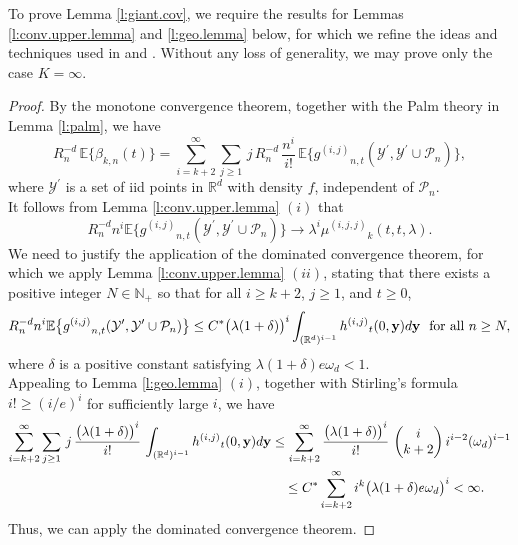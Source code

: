 \documentclass[11pt]{amsart}
\numberwithin{equation}{section}
\theoremstyle{plain}
\theoremstyle{definition}
\begin{document}
To prove Lemma \ref{l:giant.cov}, we require the results for Lemmas \ref{l:conv.upper.lemma} and \ref{l:geo.lemma} below, for which we refine the ideas and techniques used in \cite{kahle:meckes:2015} and \cite{kahle:meckes:2013}. Without any loss of generality, we may prove only the case $K=\infty$.
\begin{proof}
By the monotone convergence theorem, together with the Palm theory in Lemma \ref{l:palm}, we have
$$
R_n^{-d}\, {\mathbb{E}} \bigl\{ \beta_{k,n}(t) \bigr\} = \sum_{i=k+2}^\infty \sum_{j\geq1} \, j\, R_n^{-d}\, \frac{ n^i}{i!}\, {\mathbb{E}} \bigl\{ {g^{(i,j)}}_{n,t}({{\mathcal{Y}^{\prime}}}, {{\mathcal{Y}^{\prime}}} \cup {\mathcal P_n}) \bigr\},
$$
where ${{\mathcal{Y}^{\prime}}}$ is a set of iid points in ${{\mathbb R}}^d$ with density $f$, independent of ${\mathcal P_n}$. \\
It follows from Lemma \ref{l:conv.upper.lemma} $(i)$ that
$$
R_n^{-d} n^i {\mathbb{E}} \bigl\{ {g^{(i,j)}}_{n,t}({{\mathcal{Y}^{\prime}}}, {{\mathcal{Y}^{\prime}}} \cup {\mathcal P_n}) \bigr\} \to \lambda^i {\mu^{(i,j,j)}}_k (t,t,\lambda).
$$
We need to justify the application of the dominated convergence theorem, for which we apply Lemma \ref{l:conv.upper.lemma} $(ii)$,  stating that there exists a positive integer $N \in {{\mathbb N}}_+$ so that for all $i \geq k+2$, $j \geq 1$, and $t\geq 0$,
$$
R_n^{-d} n^i {\mathbb{E}} \bigl\{ {g^{(i,j)}}_{n,t}({{\mathcal{Y}^{\prime}}}, {{\mathcal{Y}^{\prime}}} \cup {\mathcal P_n}) \bigr\} \leq C^* \bigl( \lambda(1+\delta) \bigr)^i \int_{({{\mathbb R}}^d)^{i-1}} {h^{(i,j)}}_t(0,{{\bf y}}) d{{\bf y}} \ \ \text{for all } n \geq N,
$$
where $\delta$ is a positive constant satisfying $\lambda (1+\delta) e \omega_d < 1$. \\
Appealing to Lemma \ref{l:geo.lemma} $(i)$, together with Stirling's formula $i! \geq (i/e)^i$ for sufficiently large $i$, we have
\begin{align*}
\sum_{i=k+2}^\infty \sum_{j\geq1}\, j\, \frac{\bigl( \lambda(1+\delta) \bigr)^i}{i!}\,  \int_{({{\mathbb R}}^d)^{i-1}} {h^{(i,j)}}_t(0,{{\bf y}}) d{{\bf y}}  &\leq  \sum_{i=k+2}^\infty \frac{\bigl( \lambda(1+\delta) \bigr)^i}{i!}\, \begin{pmatrix} i \\ k+2 \end{pmatrix} i^{i-2} (\omega_d)^{i-1} \\
&\quad \leq C^* \sum_{i=k+2}^\infty i^k \bigl( \lambda (1+\delta) e \omega_d \bigr)^i < \infty.
\end{align*}
Thus, we can apply the dominated convergence theorem.


\end{proof}
\end{document}
